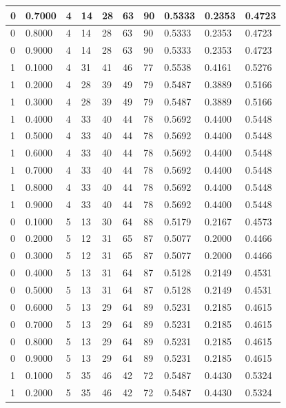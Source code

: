 \documentclass[12pt]{article}
\begin{document}
\begin{table}
{\begin{tabular}{| l | l | l | l | l | l | l | l | l | l |}
			0 & 0.7000 & 4 & 14 & 28 & 63 & 90 & 0.5333 & 0.2353 & 0.4723\\ \hline
			0 & 0.8000 & 4 & 14 & 28 & 63 & 90 & 0.5333 & 0.2353 & 0.4723\\ \hline
			0 & 0.9000 & 4 & 14 & 28 & 63 & 90 & 0.5333 & 0.2353 & 0.4723\\ \hline
			1 & 0.1000 & 4 & 31 & 41 & 46 & 77 & 0.5538 & 0.4161 & 0.5276\\ \hline
			1 & 0.2000 & 4 & 28 & 39 & 49 & 79 & 0.5487 & 0.3889 & 0.5166\\ \hline
			1 & 0.3000 & 4 & 28 & 39 & 49 & 79 & 0.5487 & 0.3889 & 0.5166\\ \hline
			1 & 0.4000 & 4 & 33 & 40 & 44 & 78 & 0.5692 & 0.4400 & 0.5448\\ \hline
			1 & 0.5000 & 4 & 33 & 40 & 44 & 78 & 0.5692 & 0.4400 & 0.5448\\ \hline
			1 & 0.6000 & 4 & 33 & 40 & 44 & 78 & 0.5692 & 0.4400 & 0.5448\\ \hline
			1 & 0.7000 & 4 & 33 & 40 & 44 & 78 & 0.5692 & 0.4400 & 0.5448\\ \hline
			1 & 0.8000 & 4 & 33 & 40 & 44 & 78 & 0.5692 & 0.4400 & 0.5448\\ \hline
			1 & 0.9000 & 4 & 33 & 40 & 44 & 78 & 0.5692 & 0.4400 & 0.5448\\ \hline
			0 & 0.1000 & 5 & 13 & 30 & 64 & 88 & 0.5179 & 0.2167 & 0.4573\\ \hline
			0 & 0.2000 & 5 & 12 & 31 & 65 & 87 & 0.5077 & 0.2000 & 0.4466\\ \hline
			0 & 0.3000 & 5 & 12 & 31 & 65 & 87 & 0.5077 & 0.2000 & 0.4466\\ \hline
			0 & 0.4000 & 5 & 13 & 31 & 64 & 87 & 0.5128 & 0.2149 & 0.4531\\ \hline
			0 & 0.5000 & 5 & 13 & 31 & 64 & 87 & 0.5128 & 0.2149 & 0.4531\\ \hline
			0 & 0.6000 & 5 & 13 & 29 & 64 & 89 & 0.5231 & 0.2185 & 0.4615\\ \hline
			0 & 0.7000 & 5 & 13 & 29 & 64 & 89 & 0.5231 & 0.2185 & 0.4615\\ \hline
			0 & 0.8000 & 5 & 13 & 29 & 64 & 89 & 0.5231 & 0.2185 & 0.4615\\ \hline
			0 & 0.9000 & 5 & 13 & 29 & 64 & 89 & 0.5231 & 0.2185 & 0.4615\\ \hline
			1 & 0.1000 & 5 & 35 & 46 & 42 & 72 & 0.5487 & 0.4430 & 0.5324\\ \hline
			1 & 0.2000 & 5 & 35 & 46 & 42 & 72 & 0.5487 & 0.4430 & 0.5324\\ \hline

\end{tabular}}
\end{table}
\end{document}
